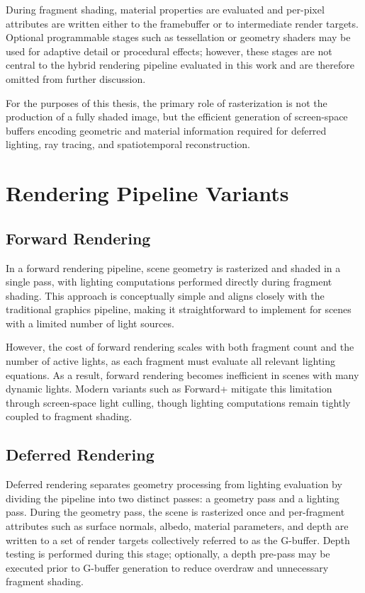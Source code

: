 \documentclass[12pt,a4paper]{report}
\newcommand{\daesection}[1]{
  \section{#1}
}
\begin{document}
During fragment shading, material properties are evaluated and per-pixel
attributes are written either to the framebuffer or to intermediate render
targets. Optional programmable stages such as tessellation or geometry shaders
may be used for adaptive detail or procedural effects; however, these stages are
not central to the hybrid rendering pipeline evaluated in this work and are
therefore omitted from further discussion.

For the purposes of this thesis, the primary role of rasterization is not the
production of a fully shaded image, but the efficient generation of screen-space
buffers encoding geometric and material information required for deferred
lighting, ray tracing, and spatiotemporal reconstruction.\cite{akenine2018realtimerendering, learnopengl}
\daesection{Rendering Pipeline Variants}
\subsection{Forward Rendering}
In a forward rendering pipeline, scene geometry is rasterized and shaded in a
single pass, with lighting computations performed directly during fragment
shading. This approach is conceptually simple and aligns closely with the
traditional graphics pipeline, making it straightforward to implement for
scenes with a limited number of light sources.

However, the cost of forward rendering scales with both fragment count and the
number of active lights, as each fragment must evaluate all relevant lighting
equations. As a result, forward rendering becomes inefficient in scenes with
many dynamic lights. Modern variants such as Forward+ mitigate this limitation
through screen-space light culling, though lighting computations remain tightly
coupled to fragment shading.
\cite{akenine2018realtimerendering, learnopengl}
\subsection{Deferred Rendering}
Deferred rendering separates geometry processing from lighting evaluation by
dividing the pipeline into two distinct passes: a geometry pass and a lighting
pass.
During the geometry pass, the scene is rasterized once and per-fragment
attributes such as surface normals, albedo, material parameters, and depth
are written to a set of render targets collectively referred to as the G-buffer.
Depth testing is performed during this stage; optionally, a depth pre-pass may
be executed prior to G-buffer generation to reduce overdraw and unnecessary
fragment shading.
\end{document}
